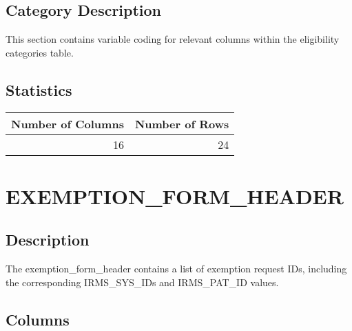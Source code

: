 \documentclass[
  letterpaper,
  DIV=11,
  numbers=noendperiod]{scrreprt}
\begin{document}
\hypertarget{category-description-7}{%
\section*{Category Description}\label{category-description-7}}

This section contains variable coding for relevant columns within the
eligibility categories table.

\hypertarget{statistics-7}{%
\section*{Statistics}\label{statistics-7}}

\begin{longtable}{rr}
\toprule
Number of Columns & Number of Rows \\ 
\midrule
16 & 24 \\ 
\bottomrule
\end{longtable}

\hypertarget{exemption_form_header}{%
\chapter*{EXEMPTION\_FORM\_HEADER}\label{exemption_form_header}}

\hypertarget{description-8}{%
\section*{Description}\label{description-8}}

The exemption\_form\_header contains a list of exemption request IDs,
including the corresponding IRMS\_SYS\_IDs and IRMS\_PAT\_ID values.

\hypertarget{columns-8}{%
\section*{Columns}\label{columns-8}}
\end{document}
